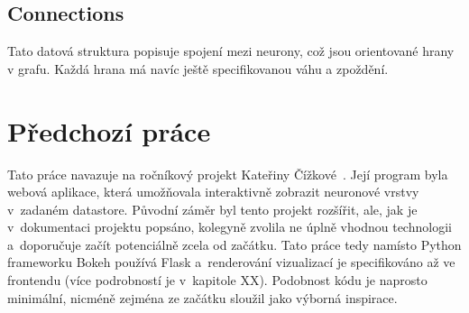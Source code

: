 \subsection{Connections}

Tato datová struktura popisuje spojení mezi neurony, což jsou orientované hrany v grafu. Každá hrana má navíc ještě specifikovanou váhu a zpoždění.

\section{Předchozí práce}

Tato práce navazuje na ročníkový projekt Kateřiny Čížkové~\cite{Cizkova2020nprg035}. Její program byla webová aplikace, která umožňovala interaktivně zobrazit neuronové vrstvy v~zadaném datastore. Původní záměr byl tento projekt rozšířit, ale, jak je v~dokumentaci projektu popsáno, kolegyně zvolila ne úplně vhodnou technologii a~doporučuje začít potenciálně zcela od začátku. Tato práce tedy namísto Python frameworku Bokeh používá Flask a~renderování vizualizací je specifikováno až ve frontendu (více podrobností je v~kapitole XX). Podobnost kódu je naprosto minimální, nicméně zejména ze začátku sloužil jako výborná inspirace.